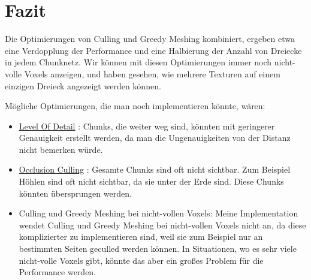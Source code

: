 \section{Fazit}

Die Optimierungen von Culling und Greedy Meshing
kombiniert, ergeben etwa eine Verdopplung der
Performance und eine Halbierung der Anzahl
von Dreiecke in jedem Chunknetz.
Wir können mit diesen Optimierungen
immer noch nicht-volle Voxels anzeigen,
und haben gesehen, wie mehrere Texturen
auf einem einzigen Dreieck angezeigt werden können.

\vspace{0.3cm}

Mögliche Optimierungen, die man noch implementieren
könnte, wären:
\begin{itemize}
	\item \href{https://de.wikipedia.org/wiki/Level_of_Detail}{Level Of Detail} \cite{lod}:
		Chunks, die weiter weg sind, könnten mit
		geringerer Genauigkeit erstellt werden,
		da man die Ungenauigkeiten von der Distanz
		nicht bemerken würde.
	\item \href{https://en.wikipedia.org/wiki/Hidden-surface_determination#Occlusion_culling}{Occlusion Culling} \cite{occlusion}:
		Gesamte Chunks sind oft nicht sichtbar.
		Zum Beispiel Höhlen sind oft nicht sichtbar,
		da sie unter der Erde sind. Diese Chunks
		könnten übersprungen werden.
	\item Culling und Greedy Meshing bei nicht-vollen Voxels:
		Meine Implementation wendet Culling und
		Greedy Meshing bei nicht-vollen Voxels
		nicht an, da diese komplizierter zu implementieren
		sind, weil sie zum Beispiel nur an bestimmten
		Seiten geculled werden können.
		In Situationen, wo es sehr viele nicht-volle
		Voxels gibt, könnte das aber ein großes Problem
		für die Performance werden.
\end{itemize}
